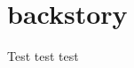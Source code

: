 \chapter{\Name{} backstory}
\label{background}

\DndDropCapLine[]{\firstNameLetter}{\GobbledName} Test test test
